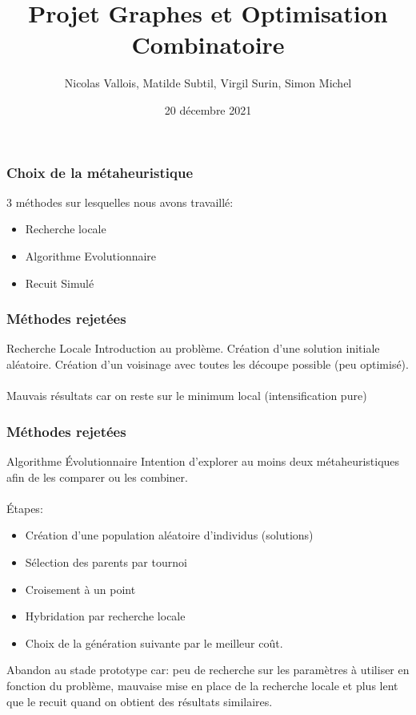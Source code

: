 \documentclass{beamer}
\title{Projet Graphes et Optimisation Combinatoire}
\author{Nicolas Vallois, Matilde Subtil, Virgil Surin, Simon Michel}
\institute{Université de Mons}
\date{20 décembre 2021}
\begin{document}
\frame{\titlepage}


\begin{frame}
    \frametitle{Choix de la métaheuristique}
    3 méthodes sur lesquelles nous avons travaillé:
    \begin{itemize}
        \item Recherche locale
        \item Algorithme Evolutionnaire
        \item Recuit Simulé
    \end{itemize}

\end{frame}

\begin{frame}
    \frametitle{Méthodes rejetées}
    \begin{block}{Recherche Locale}
        Introduction au problème.
        Création d'une solution initiale aléatoire.
        Création d'un voisinage avec toutes les découpe possible (peu optimisé).\\~\\
        \MVRightarrow{} Mauvais résultats car on reste sur le minimum local (intensification pure)
    \end{block}
    
\end{frame}

\begin{frame}
    \frametitle{Méthodes rejetées}
    \begin{block}{Algorithme Évolutionnaire}
        Intention d'explorer au moins deux métaheuristiques afin de les comparer ou les combiner. \\~\\
        Étapes:
        \begin{itemize}
            \item Création d'une population aléatoire d'individus (solutions) 
            \item Sélection des parents par tournoi
            \item Croisement à un point 
            \item Hybridation par recherche locale
            \item Choix de la génération suivante par le meilleur coût.
        \end{itemize}
        Abandon au stade prototype car: peu de recherche sur les paramètres à utiliser en fonction du problème, mauvaise mise en place de la recherche locale et plus lent que le recuit quand on obtient des résultats similaires.
    \end{block}
\end{frame}
\end{document}
